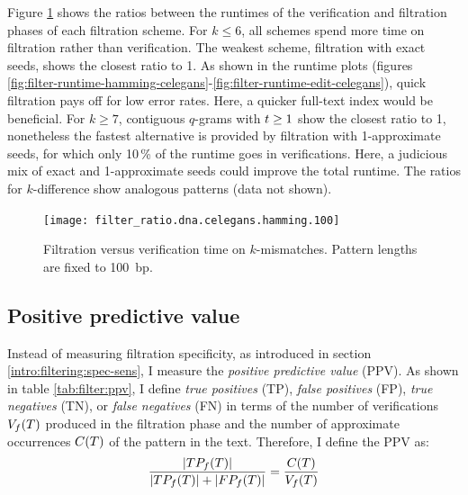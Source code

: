 Figure \ref{fig:filter-ratio-hamming-celegans} shows the ratios between the runtimes of the verification and filtration phases of each filtration scheme.
For $k \leq 6$, all schemes spend more time on filtration rather than verification.
The weakest scheme, filtration with exact seeds, shows the closest ratio to 1.
As shown in the runtime plots (figures \ref{fig:filter-runtime-hamming-celegans}-\ref{fig:filter-runtime-edit-celegans}), quick filtration pays off for low error rates.
Here, a quicker full-text index would be beneficial.
For $k \geq 7$, contiguous $q$-grams with $t \geq 1$ show the closest ratio to 1, nonetheless the fastest alternative is provided by filtration with 1-approximate seeds, for which only 10\,\% of the runtime goes in verifications.
Here, a judicious mix of exact and 1-approximate seeds could improve the total runtime.
The ratios for $k$-difference show analogous patterns (data not shown).

\begin{figure}[b]
\begin{center}
\caption[Filtration versus verification time on $k$-mismatches]{Filtration versus verification time on $k$-mismatches. Pattern lengths are fixed to 100~bp.}
\label{fig:filter-ratio-hamming-celegans}
\texttt{[image: filter\_ratio.dna.celegans.hamming.100]}
\end{center}
\end{figure}


\subsection{Positive predictive value}

Instead of measuring filtration specificity, as introduced in section \ref{intro:filtering:spec-sens}, I measure the \emph{positive predictive value} (PPV).
As shown in table \ref{tab:filter:ppv}, I define \emph{true positives} (TP), \emph{false positives} (FP), \emph{true negatives} (TN), or \emph{false negatives} (FN) in terms of the number of verifications $V_f(T)$ produced in the filtration phase and the number of approximate occurrences $C(T)$ of the pattern in the text.
Therefore, I define the PPV as:
\begin{eqnarray}
\frac{|TP_f(T)|}{|TP_f(T)| + |FP_f(T)|} = \frac{C(T)}{V_f(T)}
\end{eqnarray}

